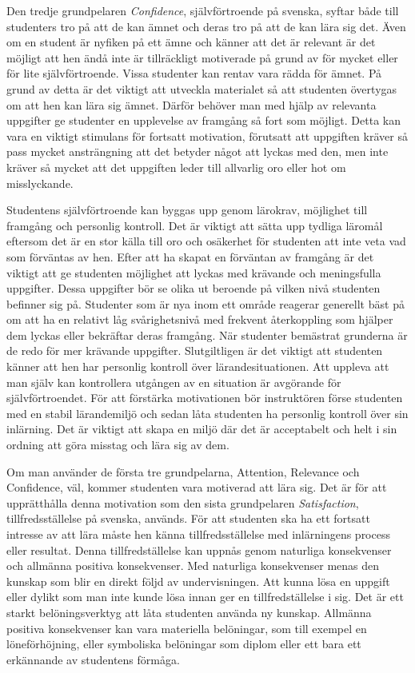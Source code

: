 \documentclass[]{article}
\begin{document}
Den tredje grundpelaren \textit{Confidence}, självförtroende på svenska,
syftar både till studenters tro på att de kan ämnet och deras tro på att
de kan lära sig det. Även om en student är nyfiken på ett ämne och känner
att det är relevant är det möjligt att hen ändå inte är tillräckligt
motiverade på grund av för mycket eller för lite självförtroende.
Vissa studenter kan rentav vara rädda för ämnet. På grund av detta är det
viktigt att utveckla materialet så att studenten övertygas om att hen kan
lära sig ämnet. Därför behöver man med hjälp av relevanta uppgifter ge studenter
en upplevelse av framgång så fort som möjligt. Detta kan vara en viktigt
stimulans för fortsatt motivation, förutsatt att uppgiften kräver så pass
mycket ansträngning att det betyder något att lyckas med den, men inte kräver
så mycket att det uppgiften leder till allvarlig oro eller hot om misslyckande.

Studentens självförtroende kan byggas upp genom lärokrav,
möjlighet till framgång och personlig kontroll.
Det är viktigt att sätta upp tydliga läromål eftersom det är en stor
källa till oro och osäkerhet för studenten att inte veta vad som
förväntas av hen. Efter att ha skapat en förväntan av framgång är det
viktigt att ge studenten möjlighet att lyckas med krävande och
meningsfulla uppgifter. Dessa uppgifter bör se olika ut beroende på
vilken nivå studenten befinner sig på. Studenter som är nya inom ett område
reagerar generellt bäst på om att ha en relativt låg svårighetsnivå med frekvent
återkoppling som hjälper dem lyckas eller bekräftar deras framgång.
När studenter bemästrat grunderna är de redo för mer krävande uppgifter.
Slutgiltligen är det viktigt att studenten känner att hen har personlig
kontroll över lärandesituationen. Att uppleva att man själv kan
kontrollera utgången av en situation är avgörande för självförtroendet.
För att förstärka motivationen bör instruktören förse studenten med en
stabil lärandemiljö och sedan låta studenten ha personlig kontroll över sin
inlärning. Det är viktigt att skapa en miljö där det är acceptabelt och helt
i sin ordning att göra misstag och lära sig av dem.

Om man använder de första tre grundpelarna, Attention, Relevance och Confidence,
väl, kommer studenten vara motiverad att lära sig.
Det är för att upprätthålla denna motivation som den sista grundpelaren
\textit{Satisfaction}, tillfredsställelse på svenska, används.
För att studenten ska ha ett fortsatt intresse av att lära måste hen känna
tillfredsställelse med inlärningens process eller resultat.
Denna tillfredställelse kan uppnås genom naturliga konsekvenser och allmänna positiva
konsekvenser. Med naturliga konsekvenser menas den kunskap som blir
en direkt följd av undervisningen. Att kunna lösa en uppgift eller dylikt
som man inte kunde lösa innan ger en tillfredställelse i sig.
Det är ett starkt belöningsverktyg att låta studenten använda ny kunskap.
Allmänna positiva konsekvenser kan vara materiella belöningar,
som till exempel en löneförhöjning, eller symboliska belöningar som diplom
eller ett bara ett erkännande av studentens förmåga.
\end{document}
